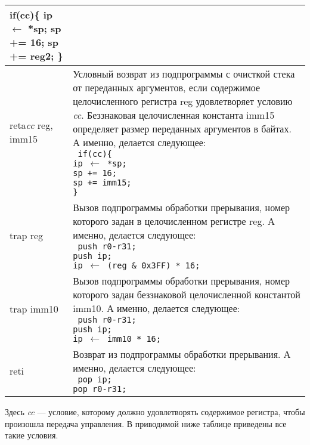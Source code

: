 \documentclass[10pt]{report}
\begin{document}
\begin{longtable}[c]{|l|p{12.5cm}|}
{{{if(cc)\{\\
\phantom{aaaa}ip $\leftarrow$ *sp;\\
\phantom{aaaa}sp += 16;\\
\phantom{aaaa}sp += reg2;\\
\}
}
}} \\ \hline
reta\textit{cc} reg, imm15   & {\parbox{12.4cm}{Условный возврат из подпрограммы с очисткой стека от переданных аргументов, если содержимое целочисленного регистра reg удовлетворяет условию \textit{cc}. Беззнаковая целочисленная константа imm15 определяет размер переданных аргументов в байтах. А именно, делается следующее:\\ %
\texttt{%
if(cc)\{\\
\phantom{aaaa}ip $\leftarrow$ *sp;\\
\phantom{aaaa}sp += 16;\\
\phantom{aaaa}sp += imm15;\\
\}
}
}} \\ \hline
trap reg                     & {\parbox{12.4cm}{Вызов подпрограммы обработки прерывания, номер которого задан в целочисленном регистре reg. А именно, делается следующее:\\ %
\texttt{%
\phantom{aaaa}push r0-r31;\\
\phantom{aaaa}push ip;\\
\phantom{aaaa}ip $\leftarrow$ (reg \& 0x3FF) * 16;
}
}} \\ \hline
trap imm10                   & {\parbox{12.4cm}{Вызов подпрограммы обработки прерывания, номер которого задан беззнаковой целочисленной константой imm10. А именно, делается следующее:\\ %
\texttt{%
\phantom{aaaa}push r0-r31;\\
\phantom{aaaa}push ip;\\
\phantom{aaaa}ip $\leftarrow$ imm10 * 16;
}
}} \\ \hline
reti                         & {\parbox{12.4cm}{Возврат из подпрограммы обработки прерывания. А именно, делается следующее:\\ %
\texttt{%
\phantom{aaaa}pop ip;\\
\phantom{aaaa}pop r0-r31;
}
}} \\ \hline
\end{longtable}    


Здесь \textit{cc} --- условие, которому должно удовлетворять содержимое регистра, чтобы произошла передача управления. В приводимой ниже таблице приведены все такие условия.
\end{document}
